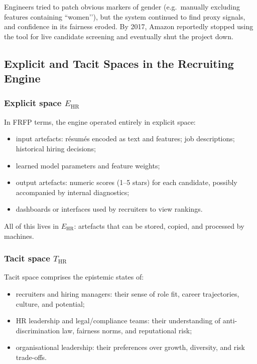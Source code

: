 Engineers tried to patch obvious markers of gender (e.g.\ manually excluding
features containing ``women’’), but the system continued to find proxy
signals, and confidence in its fairness eroded.
By 2017, Amazon reportedly stopped using the tool for live candidate
screening and eventually shut the project down.

\subsection{Explicit and Tacit Spaces in the Recruiting Engine}

\subsubsection*{Explicit space \(E_{\mathrm{HR}}\)}

In FRFP terms, the engine operated entirely in explicit space:

\begin{itemize}
  \item input artefacts: résumés encoded as text and features; job
        descriptions; historical hiring decisions;
  \item learned model parameters and feature weights;
  \item output artefacts: numeric scores (1--5 stars) for each candidate,
        possibly accompanied by internal diagnostics;
  \item dashboards or interfaces used by recruiters to view rankings.
\end{itemize}

All of this lives in \(E_{\mathrm{HR}}\): artefacts that can be stored,
copied, and processed by machines.

\subsubsection*{Tacit space \(T_{\mathrm{HR}}\)}

Tacit space comprises the epistemic states of:

\begin{itemize}
  \item recruiters and hiring managers:
        their sense of role fit, career trajectories, culture, and potential;
  \item HR leadership and legal/compliance teams:
        their understanding of anti-discrimination law, fairness norms,
        and reputational risk;
  \item organisational leadership:
        their preferences over growth, diversity, and risk trade-offs.
\end{itemize}

